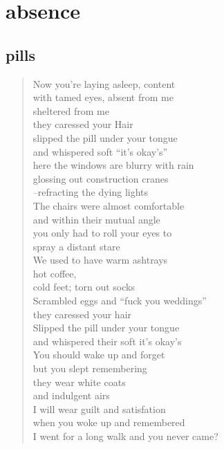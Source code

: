 \documentclass[11pt]{article}
\begin{document}
\section{absence}
\label{sec:org245d0db}
\subsection{pills}
\label{sec:orga2850a6}
\begin{verse}
Now you're laying asleep, content\\
with tamed eyes, absent from me\\
sheltered from me\\
they caressed your Hair\\
slipped the pill under your tongue\\
and whispered soft ``it's okay's''\\
here the windows are blurry with rain\\
glossing out construction cranes\\
--refracting the dying lights\\
\vspace*{1em}
The chairs were almost comfortable\\
and within their mutual angle\\
you only had to roll your eyes to\\
spray a distant stare\\
We used to have warm ashtrays\\
hot coffee,\\
cold feet; torn out socks\\
Scrambled eggs and ``fuck you weddings''\\
they caressed your hair\\
Slipped the pill under your tongue\\
and whispered their soft it's  okay's\\
\vspace*{1em}
You  should wake up and forget\\
but you slept remembering\\
they wear white coats\\
and indulgent airs\\
I will wear guilt and satisfation\\
when you woke up and remembered\\
I went for a long walk and you never came?\\
\end{verse}
\end{document}
